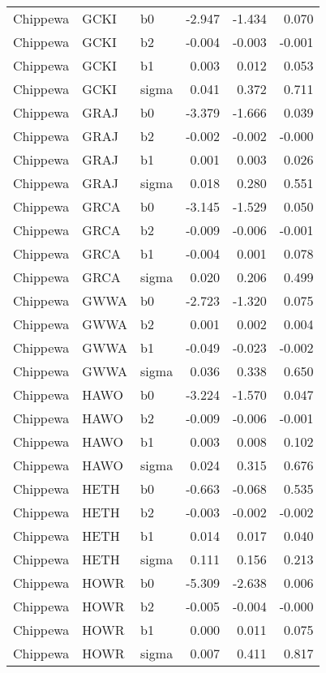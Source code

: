 \begin{table}[ht]
\begin{center}
\begin{tabular}{lllrrr}
  Chippewa & GCKI & b0 & -2.947 & -1.434 & 0.070 \\ 
  Chippewa & GCKI & b2 & -0.004 & -0.003 & -0.001 \\ 
  Chippewa & GCKI & b1 & 0.003 & 0.012 & 0.053 \\ 
  Chippewa & GCKI & sigma & 0.041 & 0.372 & 0.711 \\ 
  Chippewa & GRAJ & b0 & -3.379 & -1.666 & 0.039 \\ 
  Chippewa & GRAJ & b2 & -0.002 & -0.002 & -0.000 \\ 
  Chippewa & GRAJ & b1 & 0.001 & 0.003 & 0.026 \\ 
  Chippewa & GRAJ & sigma & 0.018 & 0.280 & 0.551 \\ 
  Chippewa & GRCA & b0 & -3.145 & -1.529 & 0.050 \\ 
  Chippewa & GRCA & b2 & -0.009 & -0.006 & -0.001 \\ 
  Chippewa & GRCA & b1 & -0.004 & 0.001 & 0.078 \\ 
  Chippewa & GRCA & sigma & 0.020 & 0.206 & 0.499 \\ 
  Chippewa & GWWA & b0 & -2.723 & -1.320 & 0.075 \\ 
  Chippewa & GWWA & b2 & 0.001 & 0.002 & 0.004 \\ 
  Chippewa & GWWA & b1 & -0.049 & -0.023 & -0.002 \\ 
  Chippewa & GWWA & sigma & 0.036 & 0.338 & 0.650 \\ 
  Chippewa & HAWO & b0 & -3.224 & -1.570 & 0.047 \\ 
  Chippewa & HAWO & b2 & -0.009 & -0.006 & -0.001 \\ 
  Chippewa & HAWO & b1 & 0.003 & 0.008 & 0.102 \\ 
  Chippewa & HAWO & sigma & 0.024 & 0.315 & 0.676 \\ 
  Chippewa & HETH & b0 & -0.663 & -0.068 & 0.535 \\ 
  Chippewa & HETH & b2 & -0.003 & -0.002 & -0.002 \\ 
  Chippewa & HETH & b1 & 0.014 & 0.017 & 0.040 \\ 
  Chippewa & HETH & sigma & 0.111 & 0.156 & 0.213 \\ 
  Chippewa & HOWR & b0 & -5.309 & -2.638 & 0.006 \\ 
  Chippewa & HOWR & b2 & -0.005 & -0.004 & -0.000 \\ 
  Chippewa & HOWR & b1 & 0.000 & 0.011 & 0.075 \\ 
  Chippewa & HOWR & sigma & 0.007 & 0.411 & 0.817 \\ 

\end{tabular}
\end{center}
\end{table}
